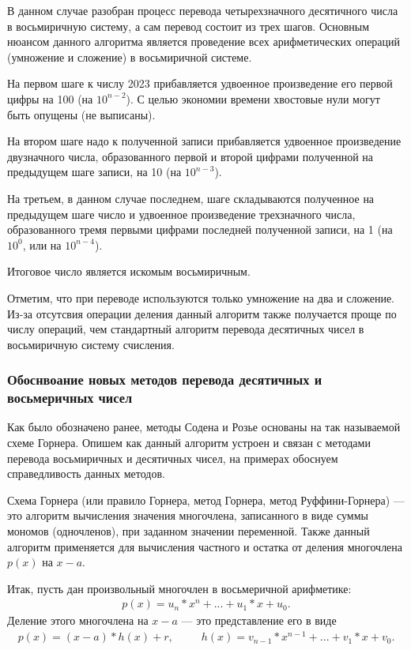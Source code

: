 \documentclass[14pt, russian]{scrartcl}
\begin{document}
В данном случае разобран процесс перевода четырехзначного десятичного числа в восьмиричную систему, а сам перевод состоит из трех шагов. Основным нюансом данного алгоритма является проведение всех арифметических операций (умножение и сложение) в восьмиричной системе.

На первом шаге к числу 2023 прибавляется удвоенное произведение его первой цифры на 100 (на $10^{n-2}$). С целью экономии времени хвостовые нули могут быть опущены (не выписаны).

На втором шаге надо к полученной записи прибавляется удвоенное произведение двузначного числа, образованного первой и второй цифрами полученной на предыдущем шаге записи, на 10 (на $10^{n-3}$).

На третьем, в данном случае последнем, шаге складываются полученное на предыдущем шаге число и удвоенное произведение трехзначного числа, образованного тремя первыми цифрами последней полученной записи, на 1 (на $10^0$, или на $10^{n-4}$).

Итоговое число является искомым восьмиричным.

Отметим, что при переводе используются только умножение на два и сложение. Из-за отсутсвия операции деления данный алгоритм также получается проще по числу операций, чем стандартный алгоритм перевода десятичных чисел в восьмиричную систему счисления.

\subsubsection{Обоснвоание новых методов перевода десятичных и восьмеричных чисел}

Как было обозначено ранее, методы Содена и Розье основаны на так называемой схеме Горнера. Опишем как данный алгоритм устроен и связан с методами перевода восьмиричных и десятичных чисел, на примерах обоснуем справедливость данных методов. 

Схема Горнера (или правило Горнера, метод Горнера, метод Руффини-Горнера) — это алгоритм вычисления значения многочлена, записанного в виде суммы мономов (одночленов), при заданном значении переменной. Также данный алгоритм применяется для вычисления частного и остатка от деления многочлена $p(x)$ на $x - a$.

Итак, пусть дан произвольный многочлен
в восьмеричной арифметике:
\label{Example:MathFont8} 
\begin{equation*}\label{eq:8}
\begin{aligned}
p(x) = u_n * x^n + ... + u_1 * x + u_0.
\end{aligned}
\end{equation*}
\noindent
Деление этого многочлена на $x - a$ — это представление его в виде 
\label{Example:MathFont9} 
\begin{equation*}\label{eq:9}
\begin{aligned}
p(x) = (x - a) * h(x) + r,\,\,\,\qquad
h(x) = v_{n-1} * x^{n-1} + ... + v_1 * x + v_0.
\end{aligned}
\end{equation*}
\end{document}
